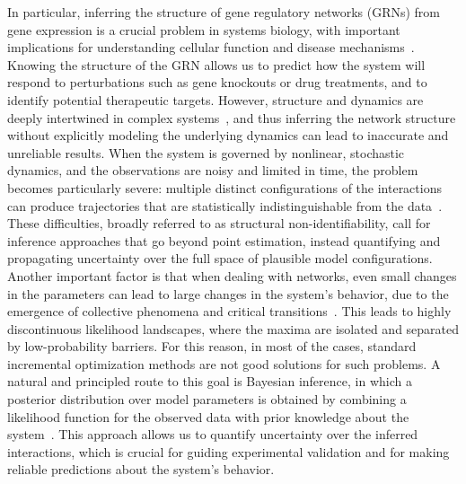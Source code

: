 \documentclass[10pt, aps, rmp,  twocolumn, superscriptaddress, floatfix, showkeys]{revtex4-2}
\begin{document}
In particular, inferring the structure of gene regulatory networks (GRNs) from gene expression is a crucial problem in systems biology, with important implications for understanding cellular function and disease mechanisms~\cite{karlebach2008modelling, barabasi2011network}. Knowing the structure of the GRN allows us to predict how the system will respond to perturbations such as gene knockouts or drug treatments, and to identify potential therapeutic targets. 
However, structure and dynamics are deeply intertwined in complex systems~\cite{gross2008adaptive,barzel2013universality,ghavasieh2024diversity,strogatz2024nonlinear,barzon2024unraveling,sole2001complexity,de2026decoding}, and thus inferring the network structure without explicitly modeling the underlying dynamics can lead to inaccurate and unreliable results. %
When the system is governed by nonlinear, stochastic dynamics, and the observations are noisy and limited in time, the problem becomes particularly severe: multiple distinct configurations of the interactions can produce trajectories that are statistically indistinguishable from the data~\cite{villaverde2014reverse}. These difficulties, broadly referred to as structural non-identifiability, call for inference approaches that go beyond point estimation, instead quantifying and propagating uncertainty over the full space of plausible model configurations.
Another important factor is that when dealing with networks, even small changes in the parameters can lead to large changes in the system's behavior, due to the emergence of collective phenomena and critical transitions~\cite{boccaletti2006complex,dorogovtsev2008critical,pastor2015epidemic, strogatz2024nonlinear}. This leads to highly discontinuous likelihood landscapes, where the maxima are isolated and separated by low-probability barriers. For this reason, in most of the cases, standard incremental optimization methods are not good solutions for such problems.
A natural and principled route to this goal is Bayesian inference, in which a posterior distribution over model parameters is obtained by combining a likelihood function for the observed data with prior knowledge about the system~\cite{peixoto2019network, newman2018network,raimondo2021measuring,peel2022statistical,peixoto2025network}. This approach allows us to quantify uncertainty over the inferred interactions, which is crucial for guiding experimental validation and for making reliable predictions about the system's behavior.
\end{document}
